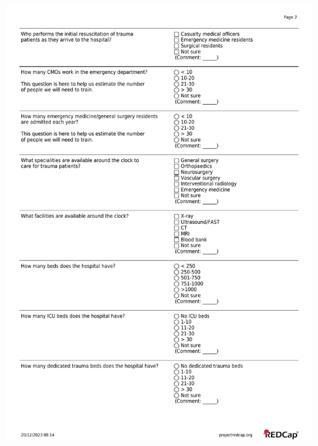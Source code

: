 \documentclass[
]{scrartcl}
\begin{document}
\includegraphics{./appendices/hospital-screening-instrument/hospital-screening-instrument-3.pdf}
\end{document}
